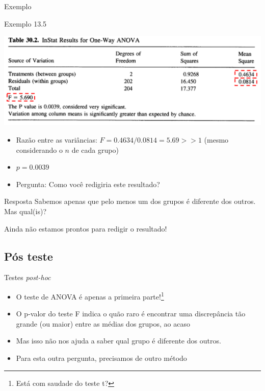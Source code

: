 \documentclass{beamer}
\begin{document}
\begin{frame}{Exemplo}
  \begin{exampleblock}{Exemplo 13.5}
    \begin{center}
      \includegraphics[width=.6\textwidth]{Cap13-30/exemplo13_5-3}
    \end{center}
  \begin{itemize}
  \item Razão entre as variâncias: $F = 0.4634/0.0814 = 5.69 >> 1$ {\tiny (mesmo considerando o $n$ de cada grupo)}
  \item $p=0.0039$
  \item Pergunta:  Como você redigiria este resultado?
  \end{itemize}
  \end{exampleblock}
\end{frame}

\begin{frame}{}
  \begin{block}{Resposta}
    Sabemos apenas que pelo menos um dos grupos é diferente dos outros.
    Mas qual(is)?

    \bigskip
    Ainda não estamos prontos para redigir o resultado!
  \end{block}
\end{frame}

\subsection{Pós teste}

\begin{frame}{Testes {\em post-hoc}}
  \begin{itemize}
  \item O teste de ANOVA é apenas a primeira parte!\footnote{Está com saudade do teste t?}
  \item O p-valor do teste F indica o quão raro é encontrar uma discrepância tão grande (ou maior) entre as médias dos grupos, ao acaso
  \item Mas isso não nos ajuda a saber qual grupo é diferente dos outros.
  \item Para esta outra pergunta, precisamos de outro método
  \end{itemize}
\end{frame}
\end{document}
